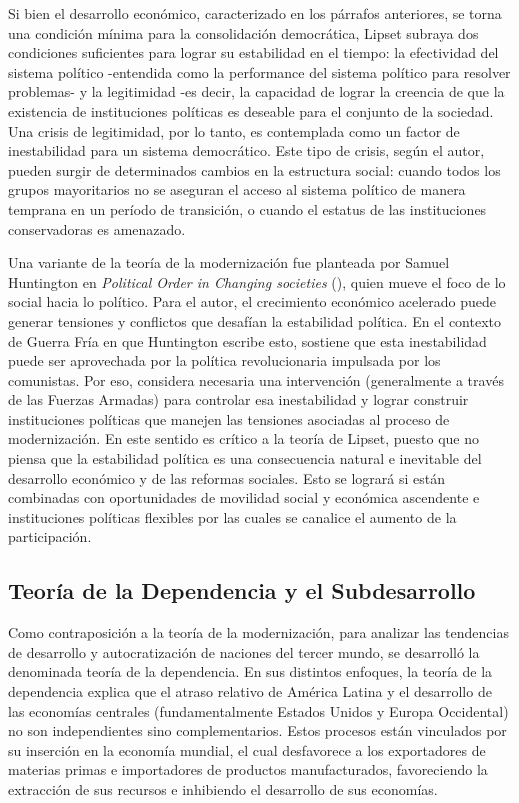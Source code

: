 \documentclass{article}
\begin{document}
Si bien el desarrollo económico, caracterizado en los párrafos anteriores, se torna una
condición mínima para la consolidación democrática, Lipset subraya dos condiciones 
suficientes para lograr su estabilidad en el tiempo: la efectividad del sistema político 
-entendida como la performance del sistema político para resolver problemas- y la 
legitimidad -es decir, la capacidad de lograr la creencia de que la existencia de 
instituciones políticas es deseable para el conjunto de la sociedad. Una crisis de 
legitimidad, por lo tanto, es contemplada como un factor de inestabilidad para un sistema 
democrático. Este tipo de crisis, según el autor, pueden surgir de determinados cambios 
en la estructura social: cuando todos los grupos mayoritarios no se aseguran el acceso al 
sistema político de manera temprana en un período de transición, o cuando el estatus de 
las instituciones conservadoras es amenazado.

Una variante de la teoría de la modernización fue planteada por Samuel Huntington 
en \textit{Political Order in Changing societies} (\citeyear{huntington68political}),
quien mueve el foco de lo social hacia lo político. Para el autor, el crecimiento 
económico acelerado puede generar tensiones y conflictos que desafían la estabilidad
política. En el contexto de Guerra Fría en que Huntington escribe esto, sostiene que
esta inestabilidad puede ser aprovechada por la política revolucionaria impulsada por
los comunistas. Por eso, considera necesaria una intervención (generalmente a través
de las Fuerzas Armadas) para controlar esa inestabilidad y lograr construir instituciones
políticas que manejen las tensiones asociadas al proceso de modernización. En este 
sentido es crítico a la teoría de Lipset, puesto que no piensa que la estabilidad política
es una consecuencia natural e inevitable del desarrollo económico y de las reformas 
sociales. Esto se logrará si están combinadas con oportunidades de movilidad social y
económica ascendente e instituciones políticas flexibles por las cuales se canalice
el aumento de la participación.

\subsection{Teoría de la Dependencia y el Subdesarrollo}

Como contraposición a la teoría de la modernización, para analizar las tendencias de
desarrollo y autocratización de naciones del tercer mundo, se desarrolló la denominada
teoría de la dependencia. En sus distintos enfoques, la teoría de la dependencia explica
que el atraso relativo de América Latina y el desarrollo de las economías centrales
(fundamentalmente Estados Unidos y Europa Occidental) no son independientes sino 
complementarios. Estos procesos están vinculados por su inserción en la economía mundial,
el cual desfavorece a los exportadores de materias primas e importadores de productos
manufacturados, favoreciendo la extracción de sus recursos e inhibiendo el desarrollo
de sus economías.
\end{document}
